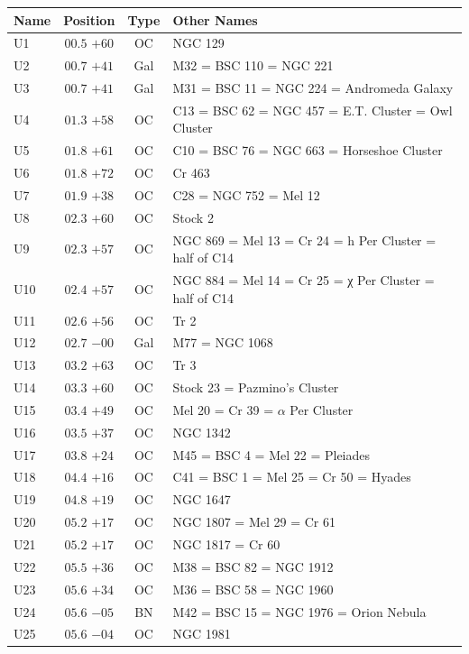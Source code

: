 
\begin{table}[t]
    \setlength{\tabcolsep}{2pt}
    \footnotesize
    \begin{tabularx}{\linewidth}{lccX}
        \hline
        Name&Position&Type&Other Names\\
        \hline

U1   &$00.5$ $+60$&OC &NGC 129\\
U2   &$00.7$ $+41$&Gal&M32 = BSC 110 = NGC 221\\
U3   &$00.7$ $+41$&Gal&M31 = BSC 11 = NGC 224 = Andromeda Galaxy\\
U4   &$01.3$ $+58$&OC &C13 = BSC 62 = NGC 457 = E.T. Cluster = Owl Cluster\\
U5   &$01.8$ $+61$&OC &C10 = BSC 76 = NGC 663 = Horseshoe Cluster\\
U6   &$01.8$ $+72$&OC &Cr 463\\
U7   &$01.9$ $+38$&OC &C28 = NGC 752 = Mel 12\\
U8   &$02.3$ $+60$&OC &Stock 2\\
U9   &$02.3$ $+57$&OC &NGC 869 = Mel 13 = Cr 24 = h Per Cluster = half of C14\\
U10  &$02.4$ $+57$&OC &NGC 884 = Mel 14 = Cr 25 = χ Per Cluster = half of C14\\
U11  &$02.6$ $+56$&OC &Tr 2\\
U12  &$02.7$ $-00$&Gal&M77 = NGC 1068\\
U13  &$03.2$ $+63$&OC &Tr 3\\
U14  &$03.3$ $+60$&OC &Stock 23 = Pazmino's Cluster\\
U15  &$03.4$ $+49$&OC &Mel 20 = Cr 39 = $\alpha$ Per Cluster\\
U16  &$03.5$ $+37$&OC &NGC 1342\\
U17  &$03.8$ $+24$&OC &M45 = BSC 4 = Mel 22 = Pleiades\\
U18  &$04.4$ $+16$&OC &C41 = BSC 1 = Mel 25 = Cr 50 = Hyades\\
U19  &$04.8$ $+19$&OC &NGC 1647\\
U20  &$05.2$ $+17$&OC &NGC 1807 = Mel 29 = Cr 61\\
U21  &$05.2$ $+17$&OC &NGC 1817 = Cr 60\\
U22  &$05.5$ $+36$&OC &M38 = BSC 82 = NGC 1912\\
U23  &$05.6$ $+34$&OC &M36 = BSC 58 = NGC 1960\\
U24  &$05.6$ $-05$&BN &M42 = BSC 15 = NGC 1976 = Orion Nebula\\
U25  &$05.6$ $-04$&OC &NGC 1981\\

\end{tabularx}
\end{table}
